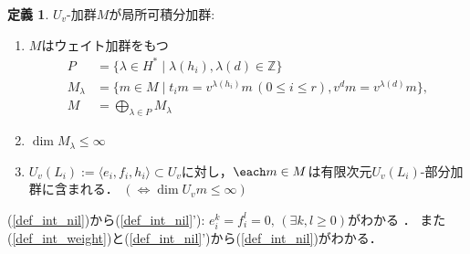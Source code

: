 \documentclass[dvipdfmx,autodetect-engine]{article}
\theoremstyle{definition}
\newtheorem{Def}{定義}
\begin{document}
    \begin{Def}
        $U_{v}$-加群$M$が局所可積分加群:
        \begin{enumerate}
            \item 
                \label{def_int_weight}
                $M$はウェイト加群をもつ
                \begin{align*}
                        P &= \{ \lambda \in H^{*} \mid \lambda(h_i), \lambda(d) \in \mathbb{Z}\}\\
                        M_{\lambda} 
                        &= \{ 
                            m \in M 
                            \mid
                            t_im = v^{\lambda(h_i)}m\,
                            (0 \leq i \leq r),
                            v^{d}m  = v^{\lambda(d)}m\},\\
                        M &= \bigoplus_{\lambda \in P} M_{\lambda}
                \end{align*}
            \item 
                \label{def_int_weight_dim}
                $\dim M_{\lambda} \leq \infty$
            \item 
                \label{def_int_nil}
                $U_{v}(L_i) := \langle e_i, f_i, h_i \rangle \subset U_{v}$に対し，$\each m \in M$は有限次元$U_{v}(L_i)$-部分加群に含まれる．
                $(\iff \dim U_{v}m \leq \infty)$
        \end{enumerate}
    \end{Def}
    (\ref{def_int_nil})から(\ref{def_int_nil}'): $e_{i}^{k} = f_{i}^{l} = 0,\,(\exists k, l \geq 0)$がわかる ．
    また(\ref{def_int_weight})と(\ref{def_int_nil}')から(\ref{def_int_nil})がわかる．
    
\end{document}
